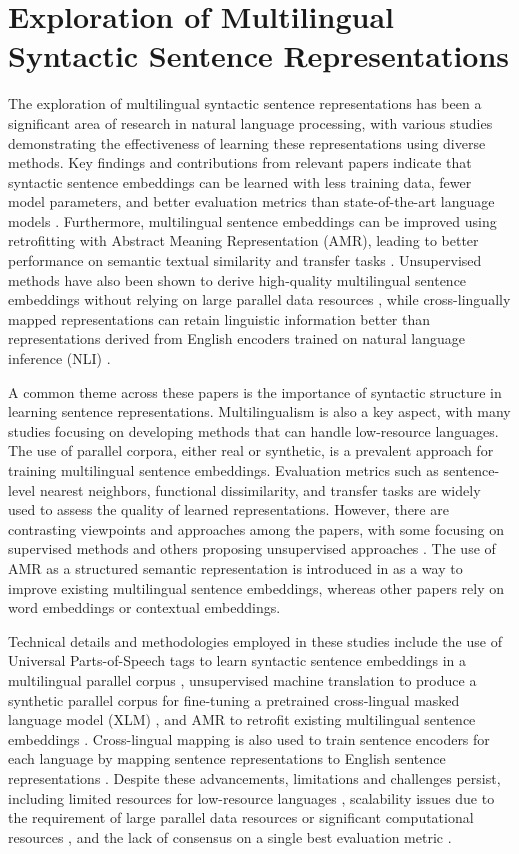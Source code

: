\documentclass[conference]{IEEEtran}
\begin{document}
\section{Exploration of Multilingual Syntactic Sentence Representations}
The exploration of multilingual syntactic sentence representations has been a significant area of research in natural language processing, with various studies demonstrating the effectiveness of learning these representations using diverse methods. Key findings and contributions from relevant papers indicate that syntactic sentence embeddings can be learned with less training data, fewer model parameters, and better evaluation metrics than state-of-the-art language models \cite{b1}. Furthermore, multilingual sentence embeddings can be improved using retrofitting with Abstract Meaning Representation (AMR), leading to better performance on semantic textual similarity and transfer tasks \cite{b5}. Unsupervised methods have also been shown to derive high-quality multilingual sentence embeddings without relying on large parallel data resources \cite{b3}, while cross-lingually mapped representations can retain linguistic information better than representations derived from English encoders trained on natural language inference (NLI) \cite{b4}.

A common theme across these papers is the importance of syntactic structure in learning sentence representations. Multilingualism is also a key aspect, with many studies focusing on developing methods that can handle low-resource languages. The use of parallel corpora, either real or synthetic, is a prevalent approach for training multilingual sentence embeddings. Evaluation metrics such as sentence-level nearest neighbors, functional dissimilarity, and transfer tasks are widely used to assess the quality of learned representations. However, there are contrasting viewpoints and approaches among the papers, with some focusing on supervised methods \cite{b1} and others proposing unsupervised approaches \cite{b3}. The use of AMR as a structured semantic representation is introduced in \cite{b5} as a way to improve existing multilingual sentence embeddings, whereas other papers rely on word embeddings or contextual embeddings.

Technical details and methodologies employed in these studies include the use of Universal Parts-of-Speech tags to learn syntactic sentence embeddings in a multilingual parallel corpus \cite{b1}, unsupervised machine translation to produce a synthetic parallel corpus for fine-tuning a pretrained cross-lingual masked language model (XLM) \cite{b3}, and AMR to retrofit existing multilingual sentence embeddings \cite{b5}. Cross-lingual mapping is also used to train sentence encoders for each language by mapping sentence representations to English sentence representations \cite{b4}. Despite these advancements, limitations and challenges persist, including limited resources for low-resource languages \cite{b2}, scalability issues due to the requirement of large parallel data resources or significant computational resources \cite{b1}, and the lack of consensus on a single best evaluation metric \cite{b4}.
\end{document}

